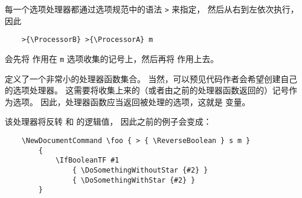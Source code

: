\documentclass{l3doc}
\begin{document}
%
每一个选项处理器都通过选项规范中的语法 \texttt{>} 来指定，
然后从右到左依次执行，因此
\begin{verbatim}
    >{\ProcessorB} >{\ProcessorA} m
\end{verbatim}
会先将  作用在 \texttt{m} 选项收集的记号上，然后再将  作用上去。

%
\begin{variable}{\ProcessedArgument}
 定义了一个非常小的处理器函数集合。
当然，可以预见代码作者会希望创建自己的选项处理器。
这需要将收集上来的（或者由之前的处理器函数返回的）记号作为选项。
因此，处理器函数应当返回被处理的选项，这就是  变量。
\end{variable}

%
\begin{function}{\ReverseBoolean}
\begin{syntax}
\end{syntax}
该处理器将反转  和  的逻辑值，
因此之前的例子会变成：
\begin{verbatim}
    \NewDocumentCommand \foo { > { \ReverseBoolean } s m }
        {
            \IfBooleanTF #1
                { \DoSomethingWithoutStar {#2} }
                { \DoSomethingWithStar {#2} }
        }
\end{verbatim}
\end{function}
\end{document}
